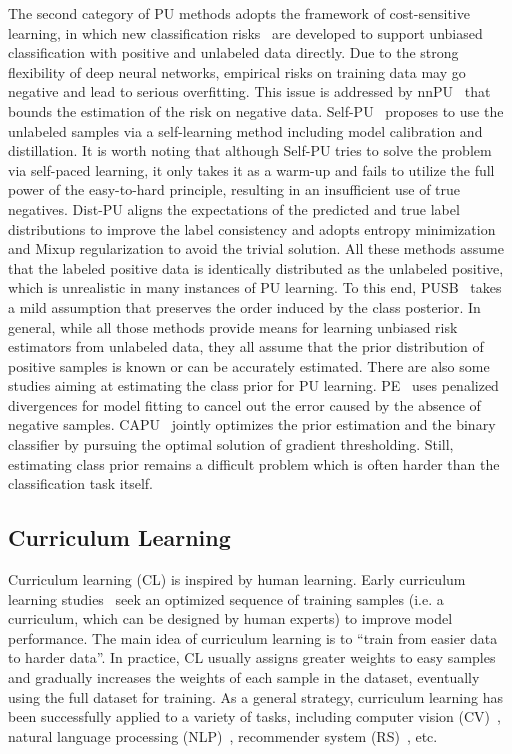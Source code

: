 \documentclass[sigconf]{acmart}
\begin{document}
The second category of PU methods adopts the framework of cost-sensitive learning, in which new classification risks~\cite{du2014analysis} are developed to support unbiased classification with positive and unlabeled data directly. Due to the strong flexibility of deep neural networks, empirical risks on training data may go negative and lead to serious overfitting. This issue is addressed by nnPU~\cite{kiryo2017positive} that bounds the estimation of the risk on negative data. Self-PU~\cite{chen2020self} proposes to use the unlabeled samples via a self-learning method including model calibration and distillation. It is worth noting that although Self-PU tries to solve the problem via self-paced learning, it only takes it as a warm-up and fails to utilize the full power of the easy-to-hard principle, resulting in an insufficient use of true negatives. Dist-PU\cite{zhao2022dist} aligns the expectations of the predicted and true label distributions to improve the label consistency and adopts entropy minimization and Mixup regularization to avoid the trivial solution. All these methods assume that the labeled positive data is identically distributed as the unlabeled positive, which is unrealistic in many instances of PU learning. To this end, PUSB~\cite{kato2018learning} takes a mild assumption that preserves the order induced by the class posterior. In general, while all those methods provide means for learning unbiased risk estimators from unlabeled data, they all assume that the prior distribution of positive samples is known or can be accurately estimated. There are also some studies aiming at estimating the class prior for PU learning. PE~\cite{christoffel2016class} uses penalized divergences for model fitting to cancel out the error caused by the absence of negative samples. CAPU~\cite{chang2021positive} jointly optimizes the prior estimation and the binary classifier by pursuing the optimal solution of gradient thresholding. Still, estimating class prior remains a difficult problem which is often harder than the classification task itself.

\subsection{Curriculum Learning}
Curriculum learning (CL) is inspired by human learning. Early curriculum learning studies~\cite{khan2011humans,basu2013teaching,zhou2021curriculum,spitkovsky2009baby} seek an optimized sequence of training samples (i.e. a curriculum, which can be designed by human experts) to improve model performance. The main idea of curriculum learning is to ``train from easier data to harder data''. In practice, CL usually assigns greater weights to easy samples and gradually increases the weights of each sample in the dataset, eventually using the full dataset for training. As a general strategy, curriculum learning has been successfully applied to a variety of tasks, including computer vision (CV)~\cite{guo2018curriculumnet}, natural language processing (NLP)~\cite{platanios2019competence}, recommender system (RS)~\cite{WangZLLZLZ23}, etc.
\end{document}
